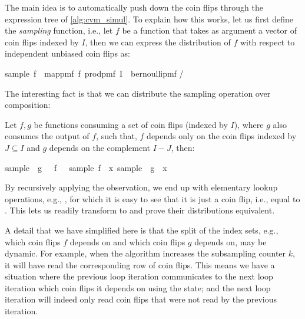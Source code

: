 \documentclass[a4paper,UKenglish,cleveref, autoref, thm-restate]{lipics-v2021}
\newenvironment{isabelle_cm}{\begin{mdframed}[backgroundcolor=shadecolor,nobreak=true,linewidth=0]\begin{isabelle}}{\end{isabelle}\end{mdframed}}%
\newcommand*\circled[1]{\tikz[baseline=(char.base)]{
            \node[shape=circle,draw, minimum size=3.5mm,inner sep=0.5pt] (char) {#1};}}
\begin{document}
The main idea is to automatically push down the coin flips through the expression tree of \cref{alg:cvm_simul}.
To explain how this works, let us first define the \emph{sampling} function, i.e., let $f$ be a function that takes as argument a vector of coin flips indexed by $I$, then we can express the distribution of $f$ with respect to independent unbiased coin flips as:
\begin{isabelle_cm}
  sample\ f\ \isacharequal\ map{\isacharunderscore}pmf\ f\ {\isacharparenleft}prod{\isacharunderscore}pmf\ I\ {\isacharparenleft}\isasymlambda\isacharunderscore\isachardot\ bernoulli{\isacharunderscore}pmf \isacharparenleft{}/\isacharparenright\isacharparenright\isacharparenright
\end{isabelle_cm}
The interesting fact is that we can distribute the sampling operation over composition:
\begin{observation}\label{o:sample_distrib} Let $f,g$ be functions consuming a set of coin flips (indexed by $I$), where $g$ also consumes the output of $f$, such that,
$f$ depends only on the coin flips indexed by $J \subseteq I$ and $g$ depends on the complement $I - J$, then:
\begin{isabelle_cm}
  sample\ \isacharparenleft\isasymlambda\isasymomega\isachardot\ g\ \isasymomega\ \isasymcirc\ f\ \isasymomega{\isacharparenright}\ \isacharequal\ sample\ f\ \isasymbind\ \isacharparenleft{\isasymlambda}x\isachardot\ sample\ \isacharparenleft\isasymlambda\isasymomega\isachardot\ g\ \isasymomega\ x\isacharparenright\isacharparenright
\end{isabelle_cm}
\end{observation}
By recursively applying the observation, we end up with elementary lookup operations, e.g., , for which it is easy to see that it is just a coin flip, i.e., equal to .
This lets us readily transform \circled{C} to \circled{B} and prove their distributions equivalent.

A detail that we have simplified here is that the split of the index sets, e.g., which coin flips $f$ depends on and which coin flips $g$ depends on, may be dynamic.
For example, when the algorithm increases the subsampling counter $k$, it will have read the corresponding row of coin flips.
This means we have a situation where the previous loop iteration communicates to the next loop iteration which coin flips it depends on using the state; and the next loop iteration will indeed only read coin flips that were not read by the previous iteration.
\end{document}
